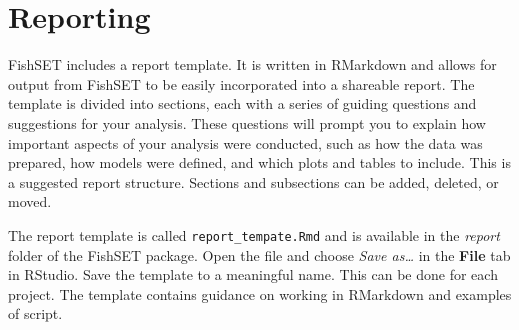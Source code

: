 \documentclass[
]{article}
\begin{document}
\hypertarget{reporting}{%
\section{Reporting}\label{reporting}}

FishSET includes a report template. It is written in RMarkdown and allows for output from FishSET to be easily incorporated into a shareable report. The template is divided into sections, each with a series of guiding questions and suggestions for your analysis. These questions will prompt you to explain how important aspects of your analysis were conducted, such as how the data was prepared, how models were defined, and which plots and tables to include. This is a suggested report structure. Sections and subsections can be added, deleted, or moved.

The report template is called \texttt{report\_tempate.Rmd} and is available in the \emph{report} folder of the FishSET package. Open the file and choose \emph{Save as\ldots{}} in the \textbf{File} tab in RStudio. Save the template to a meaningful name. This can be done for each project.
The template contains guidance on working in RMarkdown and examples of script.
\end{document}
